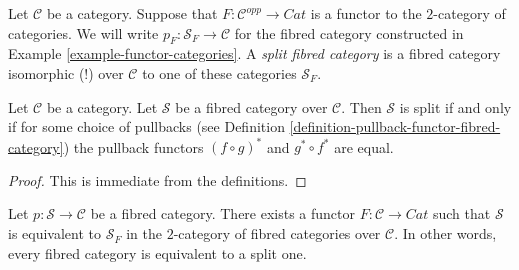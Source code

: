 \begin{definition}
\label{definition-split-fibred-category}
Let $\mathcal{C}$ be a category.
Suppose that $F : \mathcal{C}^{opp} \to \textit{Cat}$ is a functor
to the $2$-category of categories.
We will write $p_F : \mathcal{S}_F \to \mathcal{C}$ for the
fibred category constructed in
Example \ref{example-functor-categories}.
A {\it split fibred category} is a fibred category isomorphic (!)
over $\mathcal{C}$ to one of these categories {\it $\mathcal{S}_F$}.
\end{definition}

\begin{lemma}
\label{lemma-when-split}
Let $\mathcal{C}$ be a category.
Let $\mathcal{S}$ be a fibred category over $\mathcal{C}$.
Then $\mathcal{S}$ is split if and only if for some choice
of pullbacks (see Definition \ref{definition-pullback-functor-fibred-category})
the pullback functors
$(f \circ g)^*$ and $g^* \circ f^*$ are equal.
\end{lemma}

\begin{proof}
This is immediate from the definitions.
\end{proof}

\begin{lemma}
\label{lemma-fibred-strict}
Let $ p : \mathcal{S} \to \mathcal{C}$ be a fibred category.
There exists a functor $F : \mathcal{C} \to \textit{Cat}$ such that
$\mathcal{S}$ is equivalent to $\mathcal{S}_F$
in the $2$-category of fibred categories over $\mathcal{C}$. In other
words, every fibred category is equivalent to a split one.
\end{lemma}

